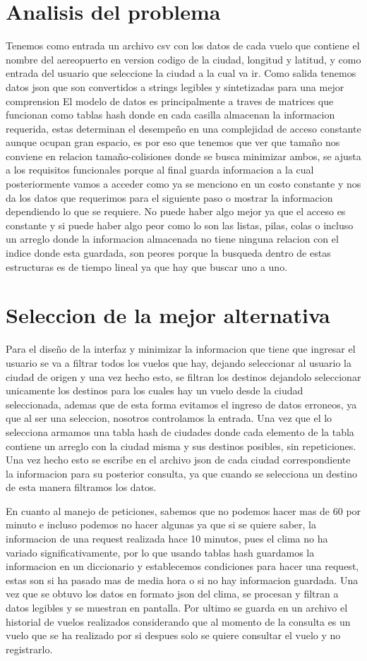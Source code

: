 \documentclass[12pt]{article}
\begin{document}
\section{Analisis del problema}
Tenemos como entrada un archivo csv con los datos de cada vuelo que contiene el nombre del aereopuerto en version codigo de la ciudad, longitud y latitud, y como entrada del usuario que seleccione la ciudad a la cual va ir.
Como salida tenemos datos json que son convertidos a strings legibles y sintetizadas para una mejor comprension
El modelo de datos es principalmente a traves de matrices que funcionan como tablas hash donde en cada casilla almacenan la informacion requerida, estas determinan el desempeño en una complejidad de acceso constante aunque ocupan gran espacio, es por eso que tenemos que ver que tamaño nos conviene en relacion tamaño-colisiones donde se busca minimizar ambos, se ajusta a los requisitos funcionales porque al final guarda informacion a la cual posteriormente vamos a acceder como ya se menciono en un costo constante y nos da los datos que requerimos para el siguiente paso o mostrar la informacion dependiendo lo que se requiere. No puede haber algo mejor ya que el acceso es constante y si puede haber algo peor como lo son las listas, pilas, colas o incluso un arreglo donde la informacion almacenada no tiene ninguna relacion con el indice donde esta guardada, son peores porque la busqueda dentro de estas estructuras es de tiempo lineal ya que hay que buscar uno a uno. 
\section{Seleccion de la mejor alternativa}
Para el diseño de la interfaz y minimizar la informacion que tiene que ingresar el usuario se va a filtrar todos los vuelos que hay, dejando seleccionar al usuario la ciudad de origen y una vez hecho esto, se filtran los destinos dejandolo seleccionar unicamente los destinos para los cuales hay un vuelo desde la ciudad seleccionada, ademas que de esta forma evitamos el ingreso de datos erroneos, ya que al ser una seleccion, nosotros controlamos la entrada. Una vez que el lo selecciona armamos una tabla hash de ciudades donde cada elemento de la tabla contiene un arreglo con la ciudad misma y sus destinos posibles, sin repeticiones. Una vez hecho esto se escribe en el archivo json de cada ciudad correspondiente la informacion para su posterior consulta, ya que cuando se selecciona un destino de esta manera filtramos los datos.

En cuanto al manejo de peticiones, sabemos que no podemos hacer mas de 60 por minuto e incluso podemos no hacer algunas ya que si se quiere saber, la informacion de una request realizada hace 10 minutos, pues el clima no ha variado significativamente, por lo que usando tablas hash guardamos la informacion en un diccionario y establecemos condiciones para hacer una request, estas son si ha pasado mas de media hora o si no hay informacion guardada. Una vez que se obtuvo los datos en formato json del clima, se procesan y filtran a datos legibles y se muestran en pantalla. Por ultimo se guarda en un archivo el historial de vuelos realizados considerando que al momento de la consulta es un vuelo que se ha realizado por si despues solo se quiere consultar el vuelo y no registrarlo.
\end{document}
